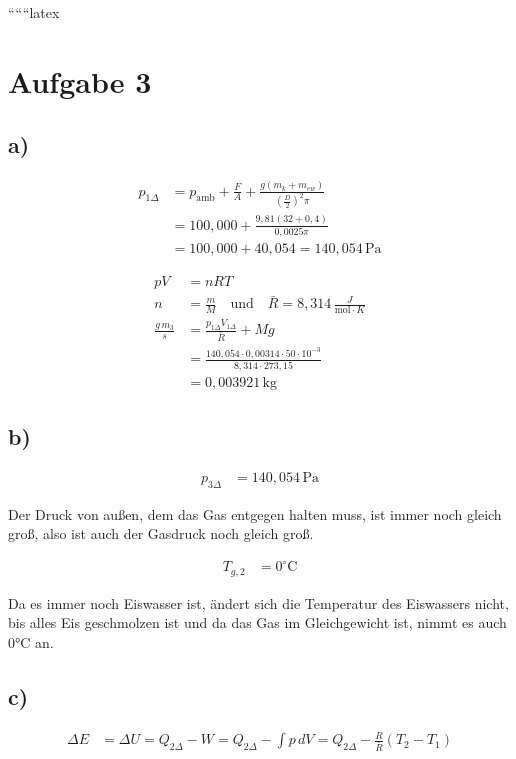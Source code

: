 
``````latex


\section*{Aufgabe 3}

\subsection*{a)}
\begin{align*}
p_{1\Delta} &= p_{\text{amb}} + \frac{F}{A} + \frac{g(m_k + m_{ew})}{\left(\frac{D}{2}\right)^2 \pi} \\
&= 100{,}000 + \frac{9{,}81(32 + 0{,}4)}{0{,}0025 \pi} \\
&= 100{,}000 + 40{,}054 = 140{,}054 \, \text{Pa}
\end{align*}

\begin{align*}
pV &= nRT \\
n &= \frac{m}{M} \quad \text{und} \quad \bar{R} = 8{,}314 \, \frac{J}{\text{mol} \cdot K} \\
\frac{g \, m_3}{s} &= \frac{p_{1\Delta} V_{1\Delta}}{\bar{R}} + Mg \\
&= \frac{140{,}054 \cdot 0{,}00314 \cdot 50 \cdot 10^{-3}}{8{,}314 \cdot 273{,}15} \\
&= 0{,}003921 \, \text{kg}
\end{align*}

\subsection*{b)}
\begin{align*}
p_{3\Delta} &= 140{,}054 \, \text{Pa}
\end{align*}

Der Druck von außen, dem das Gas entgegen halten muss, ist immer noch gleich groß, also ist auch der Gasdruck noch gleich groß.

\begin{align*}
T_{g,2} &= 0^\circ \text{C}
\end{align*}

Da es immer noch Eiswasser ist, ändert sich die Temperatur des Eiswassers nicht, bis alles Eis geschmolzen ist und da das Gas im Gleichgewicht ist, nimmt es auch 0°C an.

\subsection*{c)}
\begin{align*}
\Delta E &= \Delta U = Q_{2\Delta} - W = Q_{2\Delta} - \int p \, dV = Q_{2\Delta} - \frac{R}{\bar{R}} (T_2 - T_1)
\end{align*}

